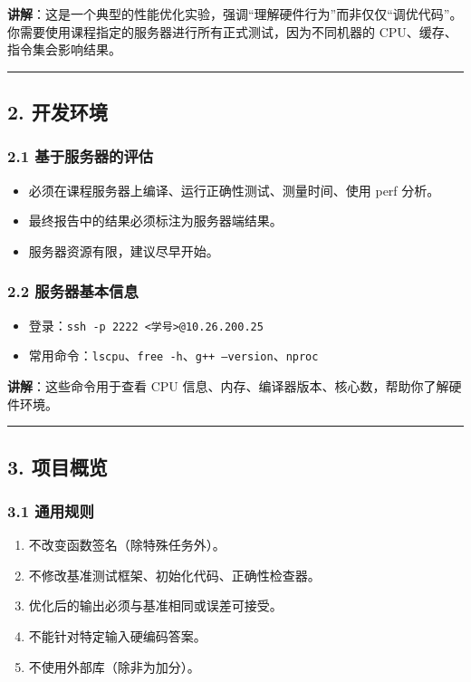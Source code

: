 \documentclass[11pt, a4paper]{article}
\begin{document}
\begin{aibox}
\textbf{讲解}：这是一个典型的性能优化实验，强调“理解硬件行为”而非仅仅“调优代码”。你需要使用课程指定的服务器进行所有正式测试，因为不同机器的 CPU、缓存、指令集会影响结果。

\begin{center}\rule{\textwidth}{0.4pt}\end{center}

\subsection*{2. 开发环境}

\subsubsection*{2.1 基于服务器的评估}
\begin{itemize}
    \item 必须在课程服务器上编译、运行正确性测试、测量时间、使用 perf 分析。
    \item 最终报告中的结果必须标注为服务器端结果。
    \item 服务器资源有限，建议尽早开始。
\end{itemize}

\subsubsection*{2.2 服务器基本信息}
\begin{itemize}
    \item 登录：\texttt{ssh -p 2222 \textless 学号\textgreater @10.26.200.25}
    \item 常用命令：\texttt{lscpu}、\texttt{free -h}、\texttt{g++ --version}、\texttt{nproc}
\end{itemize}

\textbf{讲解}：这些命令用于查看 CPU 信息、内存、编译器版本、核心数，帮助你了解硬件环境。

\begin{center}\rule{\textwidth}{0.4pt}\end{center}

\subsection*{3. 项目概览}

\subsubsection*{3.1 通用规则}
\begin{enumerate}
    \item 不改变函数签名（除特殊任务外）。
    \item 不修改基准测试框架、初始化代码、正确性检查器。
    \item 优化后的输出必须与基准相同或误差可接受。
    \item 不能针对特定输入硬编码答案。
    \item 不使用外部库（除非为加分）。
\end{enumerate}


\end{aibox}
\end{document}
